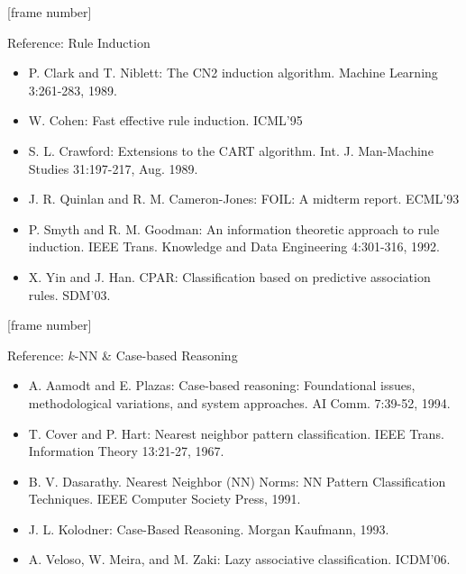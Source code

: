 \documentclass[aspectratio=169,t,table]{beamer}
\begin{document}
  {
    [frame number]
    \begin{frame}{Reference: Rule Induction}
      \begin{itemize}
        \item P. Clark and T. Niblett: The CN2 induction algorithm. Machine Learning 3:261-283, 1989.
        \item W. Cohen: Fast effective rule induction. ICML'95
        \item S. L. Crawford: Extensions to the CART algorithm. Int. J. Man-Machine Studies 31:197-217, Aug. 1989.
        \item J. R. Quinlan and R. M. Cameron-Jones: FOIL: A midterm report. ECML'93
        \item P. Smyth and R. M. Goodman: An information theoretic approach to rule induction. IEEE Trans. Knowledge and Data Engineering 4:301-316, 1992.
        \item X. Yin and J. Han. CPAR: Classification based on predictive association rules. SDM'03.
      \end{itemize}
    \end{frame}
  }

  {
    [frame number]
    \begin{frame}{Reference: $k$-NN \& Case-based Reasoning}
      \begin{itemize}
        \item A. Aamodt and E. Plazas: Case-based reasoning: Foundational issues, methodological variations, and system approaches. AI Comm. 7:39-52, 1994.
        \item T. Cover and P. Hart: Nearest neighbor pattern classification. IEEE Trans. Information Theory 13:21-27, 1967.
        \item B. V. Dasarathy. Nearest Neighbor (NN) Norms: NN Pattern Classification Techniques. IEEE Computer Society Press, 1991.
        \item J. L. Kolodner: Case-Based Reasoning. Morgan Kaufmann, 1993.
        \item A. Veloso, W. Meira, and M. Zaki: Lazy associative classification. ICDM'06.
      \end{itemize}
    \end{frame}
  }
\end{document}

